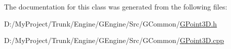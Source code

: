 The documentation for this class was generated from the following files\+:\begin{DoxyCompactItemize}
\item 
D\+:/\+My\+Project/\+Trunk/\+Engine/\+G\+Engine/\+Src/\+G\+Common/\hyperlink{_g_point3_d_8h}{G\+Point3\+D.\+h}\item 
D\+:/\+My\+Project/\+Trunk/\+Engine/\+G\+Engine/\+Src/\+G\+Common/\hyperlink{_g_point3_d_8cpp}{G\+Point3\+D.\+cpp}\end{DoxyCompactItemize}
